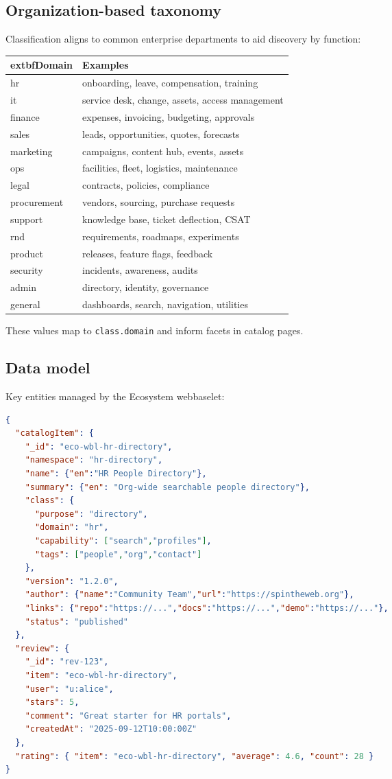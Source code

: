 \subsection{Organization-based taxonomy}
Classification aligns to common enterprise departments to aid discovery by function:
\begin{tabularx}{\linewidth}{@{}l X@{}}
  	extbf{Domain} & \textbf{Examples} \\
\hline
hr & onboarding, leave, compensation, training \\
it & service desk, change, assets, access management \\
finance & expenses, invoicing, budgeting, approvals \\
sales & leads, opportunities, quotes, forecasts \\
marketing & campaigns, content hub, events, assets \\
ops & facilities, fleet, logistics, maintenance \\
legal & contracts, policies, compliance \\
procurement & vendors, sourcing, purchase requests \\
support & knowledge base, ticket deflection, CSAT \\
rnd & requirements, roadmaps, experiments \\
product & releases, feature flags, feedback \\
security & incidents, awareness, audits \\
admin & directory, identity, governance \\
general & dashboards, search, navigation, utilities \\
\end{tabularx}

These values map to \texttt{class.domain} and inform facets in catalog pages.

\subsection{Data model}
Key entities managed by the Ecosystem webbaselet:
\begin{lstlisting}[language=JSON,caption={Ecosystem entities}]
{
  "catalogItem": {
    "_id": "eco-wbl-hr-directory",
    "namespace": "hr-directory",
    "name": {"en":"HR People Directory"},
    "summary": {"en": "Org-wide searchable people directory"},
    "class": {
      "purpose": "directory",
      "domain": "hr",
      "capability": ["search","profiles"],
      "tags": ["people","org","contact"]
    },
    "version": "1.2.0",
    "author": {"name":"Community Team","url":"https://spintheweb.org"},
    "links": {"repo":"https://...","docs":"https://...","demo":"https://..."},
    "status": "published"
  },
  "review": {
    "_id": "rev-123",
    "item": "eco-wbl-hr-directory",
    "user": "u:alice",
    "stars": 5,
    "comment": "Great starter for HR portals",
    "createdAt": "2025-09-12T10:00:00Z"
  },
  "rating": { "item": "eco-wbl-hr-directory", "average": 4.6, "count": 28 }
}
\end{lstlisting}


